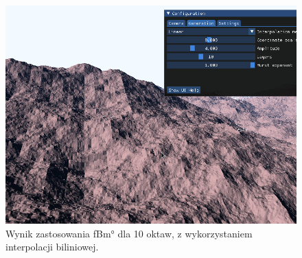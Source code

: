 \begin{figure}
\centering
\includegraphics[width=1\textwidth]{./graf/fbm-bilin.png}
\caption{Wynik zastosowania \ang{fBm} dla 10 oktaw, z wykorzystaniem interpolacji biliniowej.}
\label{fig:fbm-bilin-align}
\end{figure}



